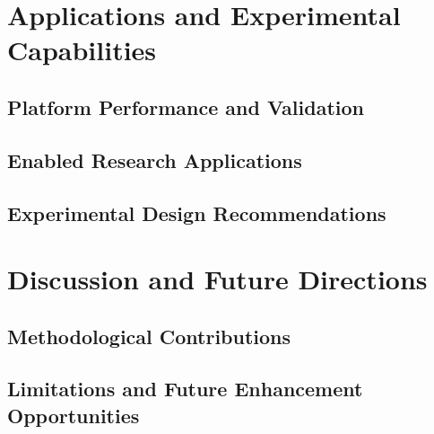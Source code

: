 \section{Applications and Experimental Capabilities}

\subsection{Platform Performance and Validation}

\subsection{Enabled Research Applications}

\subsection{Experimental Design Recommendations}

\section{Discussion and Future Directions}

\subsection{Methodological Contributions}

\subsection{Limitations and Future Enhancement Opportunities}

